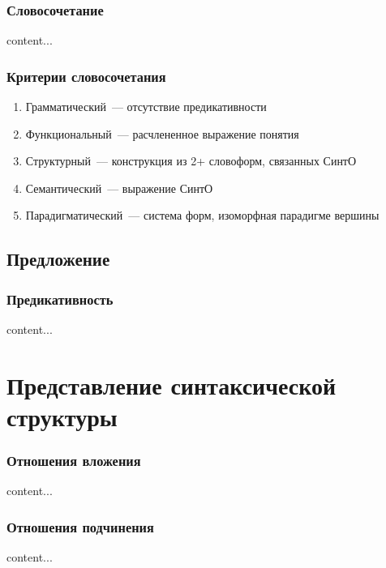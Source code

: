 \begin{frame}
  \frametitle{Словосочетание}
  content...
\end{frame}

\begin{frame}
  \frametitle{Критерии словосочетания}

  \begin{enumerate}
    \item Грамматический~--- отсутствие предикативности
    \item Функциональный~--- расчлененное выражение понятия
    \item Структурный~--- конструкция из 2+ словоформ, связанных СинтО
    \item Семантический~--- выражение СинтО
    \item Парадигматический~--- система форм, изоморфная парадигме вершины
  \end{enumerate}
\end{frame}

\subsection{Предложение}

\begin{frame}
  \frametitle{Предикативность}
  content...
\end{frame}

\section{Представление синтаксической структуры}
\frame{\tableofcontents[currentsection]}

\begin{frame}
  \frametitle{Отношения вложения}
  content...
\end{frame}

\begin{frame}
  \frametitle{Отношения подчинения}
  content...
\end{frame}

